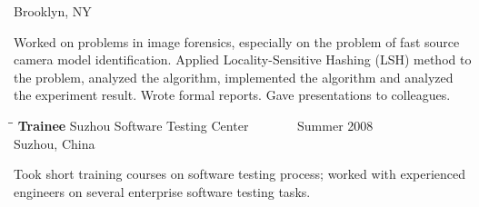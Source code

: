 \documentclass{res}
\begin{document}
\begin{resume}
\begin{tabbing}
                             \>Brooklyn, NY
   \end{tabbing}\vspace{-20pt}      %
     Worked on problems in image forensics, especially on the problem of fast source camera model identification. Applied Locality-Sensitive Hashing (LSH) method to the problem, analyzed the algorithm, implemented the algorithm and analyzed the experiment result. Wrote formal reports. Gave presentations to colleagues. 
   \begin{tabbing}%
   \hspace{2.3in}\= \hspace{2.6in}\= \kill %
   {\bf Trainee}  \>Suzhou Software Testing Center\> ~~~~~~~Summer  2008\\
                          \>Suzhou, China
   \end{tabbing}\vspace{-20pt}
    Took short training courses on software testing process; worked with experienced engineers on several enterprise software testing tasks.   \\



\end{resume}
\end{document}
